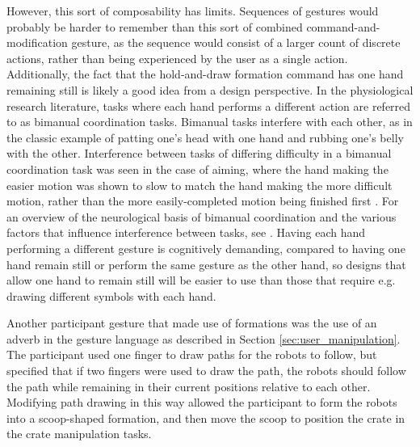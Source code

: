 However, this sort of composability has limits. 
Sequences of gestures would probably be harder to remember than this sort of combined command-and-modification gesture, as the sequence would consist of a larger count of discrete actions, rather than being experienced by the user as a single action. 
Additionally, the fact that the hold-and-draw formation command has one hand remaining still is likely a good idea from a design perspective. 
In the physiological research literature, tasks where each hand performs a different action are referred to as bimanual coordination tasks.
Bimanual tasks interfere with each other, as in the classic example of patting one's head with one hand and rubbing one's belly with the other. 
Interference between tasks of differing difficulty in a bimanual coordination task was seen in the case of aiming, where the hand making the easier motion was shown to slow to match the hand making the more difficult motion, rather than the more easily-completed motion being finished first \citep{fitts1954information}.
For an overview of the neurological basis of bimanual coordination and the various factors that influence interference between tasks, see \citep{swinnen2004two}. 
Having each hand performing a different gesture is cognitively demanding, compared to having one hand remain still or perform the same gesture as the other hand, so designs that allow one hand to remain still will be easier to use than those that require e.g. drawing different symbols with each hand. 

Another participant gesture that made use of formations was the use of an adverb in the gesture language as described in Section \ref{sec:user_manipulation}. 
The participant used one finger to draw paths for the robots to follow, but specified that if two fingers were used to draw the path, the robots should follow the path while remaining in their current positions relative to each other. 
Modifying path drawing in this way allowed the participant to form the robots into a scoop-shaped formation, and then move the scoop to position the crate in the crate manipulation tasks. 

